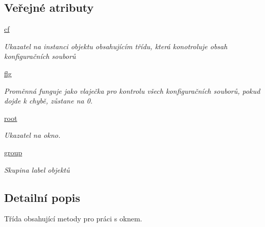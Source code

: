 \subsection*{Veřejné atributy}
\begin{DoxyCompactItemize}
\item 
\hypertarget{classtestsConf_1_1App_a9716ea53d31a500ef03a157f6f0beecc}{\hyperlink{classtestsConf_1_1App_a9716ea53d31a500ef03a157f6f0beecc}{cf}}\label{d0/dec/classtestsConf_1_1App_a9716ea53d31a500ef03a157f6f0beecc}

\begin{DoxyCompactList}\small\item\em Ukazatel na instanci objektu obsahujícím třídu, která konotroluje obsah konfiguračních souborů \end{DoxyCompactList}\item 
\hypertarget{classtestsConf_1_1App_ac741088a5f18903e28c278171ccf3090}{\hyperlink{classtestsConf_1_1App_ac741088a5f18903e28c278171ccf3090}{flg}}\label{d0/dec/classtestsConf_1_1App_ac741088a5f18903e28c278171ccf3090}

\begin{DoxyCompactList}\small\item\em Proměnná funguje jako vlaječka pro kontrolu všech konfiguračních souborů, pokud dojde k chybě, zůstane na 0. \end{DoxyCompactList}\item 
\hypertarget{classtestsConf_1_1App_aebdb04ba52c87ce6a318f84c8a684739}{\hyperlink{classtestsConf_1_1App_aebdb04ba52c87ce6a318f84c8a684739}{root}}\label{d0/dec/classtestsConf_1_1App_aebdb04ba52c87ce6a318f84c8a684739}

\begin{DoxyCompactList}\small\item\em Ukazatel na okno. \end{DoxyCompactList}\item 
\hypertarget{classtestsConf_1_1App_adcc7e371225beb5afe9c8b92bd88894e}{\hyperlink{classtestsConf_1_1App_adcc7e371225beb5afe9c8b92bd88894e}{group}}\label{d0/dec/classtestsConf_1_1App_adcc7e371225beb5afe9c8b92bd88894e}

\begin{DoxyCompactList}\small\item\em Skupina label objektů \end{DoxyCompactList}\end{DoxyCompactItemize}


\subsection{Detailní popis}
Třída obsahující metody pro práci s oknem. 

